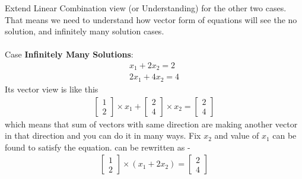 \documentclass{article}
\begin{document}
Extend Linear Combination view (or Understanding) for the other two cases. That means we need to understand how vector form of equations will see the no solution, and infinitely many solution cases.\\ \\
Case \textbf{Infinitely Many Solutions}:
\begin{align}
    x_1 + 2x_2 = 2 \nonumber\\
    2x_1 + 4x_2 = 4  \nonumber
\end{align}
Its vector view is like this
\begin{align}
    \begin{bmatrix}
    1\\2
    \end{bmatrix} \times x_1 +
    \begin{bmatrix}
    2\\4
    \end{bmatrix} \times x_2 = 
    \begin{bmatrix}
    2\\4
    \end{bmatrix} \nonumber
\end{align}
which means that sum of vectors with same direction are making another vector in that direction and you can do it in many ways. Fix $x_2$ and value of $x_1$ can be found to satisfy the equation.
can be rewritten as -
\begin{align}
    \begin{bmatrix}
    1\\2
    \end{bmatrix} \times (x_1 +2x_2)=\begin{bmatrix}
    2\\4
    \end{bmatrix} \nonumber
\end{align}
\end{document}
